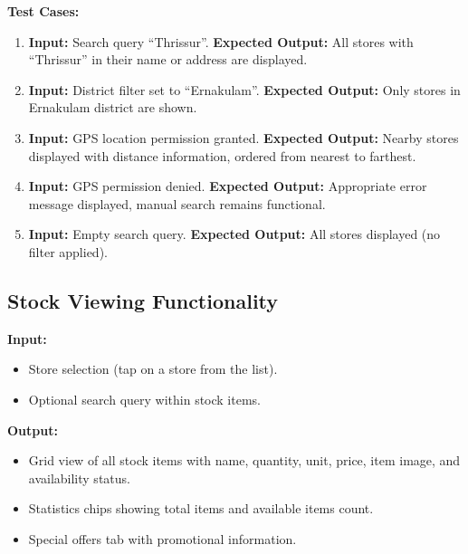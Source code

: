\textbf{Test Cases:}
\begin{enumerate}
    \item \textbf{Input:} Search query ``Thrissur''. \textbf{Expected Output:} All stores with ``Thrissur'' in their name or address are displayed.

    \item \textbf{Input:} District filter set to ``Ernakulam''. \textbf{Expected Output:} Only stores in Ernakulam district are shown.

    \item \textbf{Input:} GPS location permission granted. \textbf{Expected Output:} Nearby stores displayed with distance information, ordered from nearest to farthest.

    \item \textbf{Input:} GPS permission denied. \textbf{Expected Output:} Appropriate error message displayed, manual search remains functional.

    \item \textbf{Input:} Empty search query. \textbf{Expected Output:} All stores displayed (no filter applied).
\end{enumerate}

\subsection{Stock Viewing Functionality}

\textbf{Input:}
\begin{itemize}
    \item Store selection (tap on a store from the list).
    \item Optional search query within stock items.
\end{itemize}

\textbf{Output:}
\begin{itemize}
    \item Grid view of all stock items with name, quantity, unit, price, item image, and availability status.
    \item Statistics chips showing total items and available items count.
    \item Special offers tab with promotional information.
\end{itemize}

